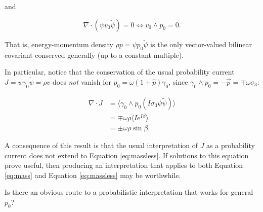 \documentclass{article}
\begin{document}
  and

  \begin{equation}
    \nabla \cdot (\psi v_0 \widetilde \psi) = 0 \iff v_0 \wedge p_0 = 0. 
  \end{equation}

  That is, energy-momentum density $\rho p = \psi p_0 \widetilde \psi$ is the only vector-valued bilinear covariant conserved generally (up to a constant multiple).

  In particular, notice that the conservation of the usual probability current $J = \psi \gamma_0 \widetilde \psi = \rho v$ does \emph{not} vanish for $p_0 = \omega (1 + \hat p) \gamma_0$, since $\gamma_0 \wedge p_0 = - \vec p = \mp \omega \sigma_3$:

  \begin{align}
    \nabla \cdot J &= \langle \gamma_0 \wedge p_0 (I \sigma_3 \psi \widetilde \psi) \rangle \\
                   &= \mp \omega \rho \langle I e^{I \beta} \rangle \\
                   &= \pm \omega \rho \sin \beta.
  \end{align}

  A consequence of this result is that the usual interpretation of $J$ as a probability current does not extend to Equation \ref{eq:massless}. If solutions to this equation prove useful, then producing an interpretation that applies to both Equation \ref{eq:mass} and Equation \ref{eq:massless} may be worthwhile.

  Is there an obvious route to a probabilistic interpretation that works for general $p_0$?






\end{document}
